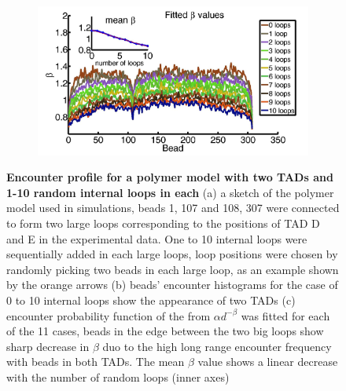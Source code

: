 \documentclass[12pt]{article}
\begin{document}
\begin{figure}[H]
\begin{subfigure}[b]{0.12\textwidth}
\includegraphics[scale=0.2]{fittedExpTwoFixedLoop1To10RandomLoops307Beads}
\caption{}
\end{subfigure}
\caption{\textbf{Encounter profile for a polymer model with two TADs and 1-10 random internal loops in each} (a) a sketch of the polymer model used in simulations, beads 1, 107 and 108, 307 were connected to form two large loops corresponding to the positions of TAD D and E in the experimental data. One to 10 internal loops were sequentially added in each large loops, loop positions were chosen by randomly picking two beads in each large loop, as an example shown by the orange arrows (b) beads' encounter histograms for the case of 0 to 10 internal loops show the appearance of two TADs (c) encounter probability function of the from $\alpha d^{-\beta}$ was fitted for each of the 11 cases, beads in the edge between the two big loops show sharp decrease in $\beta$ duo to the high long range encounter frequency with beads in both TADs. The mean $\beta$ value shows a linear decrease with the number of random loops (inner axes)}
\label{figure_encounterProfileTwoTADs}

\end{figure}



\end{document}
